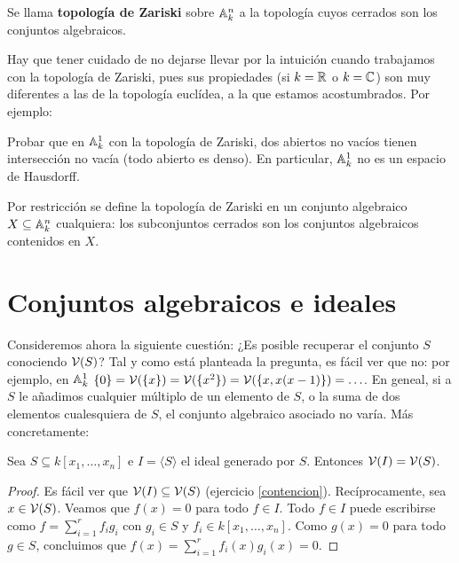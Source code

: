 \documentclass[ACGA.tex]{subfiles}
\begin{document}
\begin{defi}
 Se llama {\bf topología de Zariski} sobre $\mathbb{A}^n_k$ a la topología cuyos cerrados son los conjuntos algebraicos.
\end{defi}

Hay que tener cuidado de no dejarse llevar por la intuición cuando trabajamos con la topología de Zariski, pues sus propiedades (si $k=\mathbb{R}$ o $k=\mathbb{C}$) son muy diferentes a las de la topología euclídea, a la que estamos acostumbrados. Por ejemplo:

\begin{ejer} Probar que en $\mathbb{A}^1_k$ con la topología de Zariski, dos abiertos no vacíos tienen intersección no vacía (todo abierto es denso). En particular, $\mathbb{A}^1_k$ no es un espacio de Hausdorff.
 
\end{ejer}

Por restricción se define la topología de Zariski en un conjunto algebraico $X\subseteq\mathbb{A}^n_k$ cualquiera: los subconjuntos cerrados son los conjuntos algebraicos contenidos en $X$.

\section{Conjuntos algebraicos e ideales}

Consideremos ahora la siguiente cuestión: ¿Es posible recuperar el conjunto $S$ conociendo $\mathcal{V}(S)$? Tal y como está planteada la pregunta, es fácil ver que no: por ejemplo, en $\mathbb{A}^1_k$ $\{0\}=\mathcal{V}(\{x\})=\mathcal{V}(\{x^2\})=\mathcal{V}(\{x,x(x-1)\})=\ldots$. En geneal, si a $S$ le añadimos cualquier múltiplo de un elemento de $S$, o la suma de dos elementos cualesquiera de $S$, el conjunto algebraico asociado no varía. Más concretamente:

\begin{prop} Sea $S\subseteq k[x_1,\ldots,x_n]$ e $I=\langle S\rangle$ el ideal generado por $S$. Entonces $\mathcal{V}(I)=\mathcal{V}(S)$.
 
\end{prop}

\begin{proof}
 Es fácil ver que $\mathcal{V}(I)\subseteq \mathcal{V}(S)$ (ejercicio \ref{contencion}). Recíprocamente, sea $x\in \mathcal{V}(S)$. Veamos que $f(x)=0$ para todo $f\in I$. Todo $f\in I$ puede escribirse como $f=\sum_{i=1}^r f_i g_i$ con $g_i\in S$ y $f_i\in k[x_1,\ldots,x_n]$. Como $g(x)=0$ para todo $g\in S$, concluimos que $f(x)=\sum_{i=1}^r f_i(x)g_i(x)=0$.
\end{proof}
\end{document}

